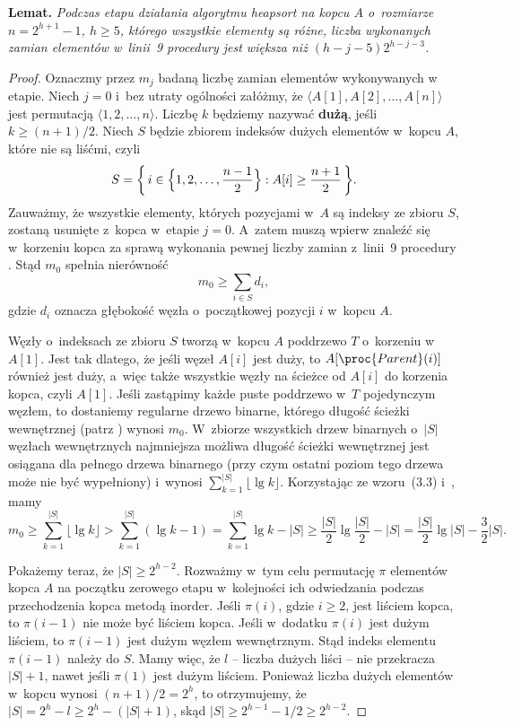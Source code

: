 \medskip
\noindent\textsf{\textbf{Lemat.}} \textit{Podczas\/  etapu działania algorytmu heapsort na kopcu\/ $A$ o~rozmiarze\/ $n=2^{h+1}-1$,\/ $h\ge5$, którego wszystkie elementy są różne, liczba wykonanych zamian elementów w~linii~9 procedury  jest większa niż\/ $(h-j-5)2^{h-j-3}$.}
\begin{proof}
Oznaczmy przez $m_j$ badaną liczbę zamian elementów wykonywanych w~ etapie.
Niech $j=0$ i~bez utraty ogólności załóżmy, że $\langle A[1],A[2],\dots,A[n]\rangle$ jest permutacją $\langle1,2,\dots,n\rangle$.
Liczbę $k$ będziemy nazywać \textbf{dużą}, jeśli $k\ge(n+1)/2$.
Niech $S$ będzie zbiorem indeksów dużych elementów w~kopcu $A$, które nie są liśćmi, czyli
\[
    S = \biggl\{\,i\in\Bigl\{1,2,\dots,\frac{n-1}{2}\Bigr\}:A[i]\ge\frac{n+1}{2}\,\biggr\}.
\]
Zauważmy, że wszystkie elementy, których pozycjami w~$A$ są indeksy ze zbioru $S$, zostaną usunięte z~kopca w~etapie $j=0$.
A~zatem muszą wpierw znaleźć się w~korzeniu kopca za sprawą wykonania pewnej liczby zamian z~linii~9 procedury .
Stąd $m_0$ spełnia nierówność
\[
    m_0 \ge \sum_{i\in S}d_i,
\]
gdzie $d_i$ oznacza głębokość węzła o~początkowej pozycji $i$ w~kopcu $A$.

Węzły o~indeksach ze zbioru $S$ tworzą w~kopcu $A$ poddrzewo $T$ o~korzeniu w~$A[1]$.
Jest tak dlatego, że jeśli węzeł $A[i]$ jest duży, to $A[\proc{Parent}(i)]$ również jest duży, a~więc także wszystkie węzły na ścieżce od $A[i]$ do korzenia kopca, czyli $A[1]$.
Jeśli zastąpimy każde puste poddrzewo w~$T$ pojedynczym węzłem, to dostaniemy regularne drzewo binarne, którego długość ścieżki wewnętrznej (patrz ) wynosi $m_0$.
W~zbiorze wszystkich drzew binarnych o~$|S|$ węzłach wewnętrznych najmniejsza możliwa długość ścieżki wewnętrznej jest osiągana dla pełnego drzewa binarnego (przy czym ostatni poziom tego drzewa może nie być wypełniony) i~wynosi $\sum_{k=1}^{|S|}\lfloor\lg k\rfloor$.
Korzystając ze wzoru~(3.3) i~, mamy
\[
    m_0 \ge \sum_{k=1}^{|S|}\lfloor\lg k\rfloor > \sum_{k=1}^{|S|}(\lg k-1) = \sum_{k=1}^{|S|}\lg k-|S| \ge \frac{|S|}{2}\lg\frac{|S|}{2}-|S| = \frac{|S|}{2}\lg|S|-\frac{3}{2}|S|.
\]

Pokażemy teraz, że $|S|\ge2^{h-2}$.
Rozważmy w~tym celu permutację $\pi$ elementów kopca $A$ na początku zerowego etapu w~kolejności ich odwiedzania podczas przechodzenia kopca metodą inorder.
Jeśli $\pi(i)$, gdzie $i\ge2$, jest liściem kopca, to $\pi(i-1)$ nie może być liściem kopca.
Jeśli w~dodatku $\pi(i)$ jest dużym liściem, to $\pi(i-1)$ jest dużym węzłem wewnętrznym.
Stąd indeks elementu $\pi(i-1)$ należy do $S$.
Mamy więc, że $l$ -- liczba dużych liści -- nie przekracza $|S|+1$, nawet jeśli $\pi(1)$ jest dużym liściem.
Ponieważ liczba dużych elementów w~kopcu wynosi $(n+1)/2=2^h$, to otrzymujemy, że $|S|=2^h-l\ge2^h-(|S|+1)$, skąd $|S|\ge2^{h-1}-1/2\ge2^{h-2}$.


\end{proof}
